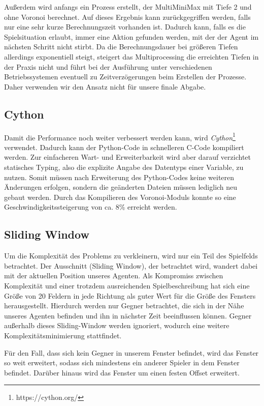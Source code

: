 Außerdem wird anfangs ein Prozess erstellt, der MultiMiniMax mit Tiefe 2 und ohne Voronoi berechnet. Auf dieses Ergebnis kann zurückgegriffen werden, falls nur eine sehr kurze Berechnungszeit vorhanden ist. Dadurch kann, falls es die Spielsituation erlaubt, immer eine Aktion gefunden werden, mit der der Agent im nächsten Schritt nicht stirbt. Da die Berechnungsdauer bei größeren Tiefen allerdings exponentiell steigt, steigert das Multiprocessing die erreichten Tiefen in der Praxis nicht und führt bei der Ausführung unter verschiedenen Betriebssystemen eventuell zu Zeitverzögerungen beim Erstellen der Prozesse. Daher verwenden wir den Ansatz nicht für unsere finale Abgabe.

\subsection{Cython}
Damit die Performance noch weiter verbessert werden kann, wird \textit{Cython}\footnote{https://cython.org/} verwendet. Dadurch kann der Python-Code in schnelleren C-Code kompiliert werden. Zur einfacheren Wart- und Erweiterbarkeit wird aber darauf verzichtet statisches Typing, also die explizite Angabe des Datentyps einer Variable, zu nutzen. Somit müssen nach Erweiterung des Python-Codes keine weiteren Änderungen erfolgen, sondern die geänderten Dateien müssen lediglich neu gebaut werden. Durch das Kompilieren des Voronoi-Moduls konnte so eine Geschwindigkeitssteigerung von ca. 8\% erreicht werden.

\subsection{Sliding Window}
Um die Komplexität des Problems zu verkleinern, wird nur ein Teil des Spielfelds betrachtet. Der Ausschnitt (Sliding Window), der betrachtet wird, wandert dabei mit der aktuellen Position unseres Agenten. Als Kompromiss zwischen Komplexität und einer trotzdem ausreichenden Spielbeschreibung hat sich eine Größe von 20 Feldern in jede Richtung als guter Wert für die Größe des Fensters herausgestellt. Hierdurch werden nur Gegner betrachtet, die sich in der Nähe unseres Agenten befinden und ihn in nächster Zeit beeinflussen können. Gegner außerhalb dieses Sliding-Window werden ignoriert, wodurch eine weitere Komplexitätsminimierung stattfindet.

Für den Fall, dass sich kein Gegner in unserem Fenster befindet, wird das Fenster so weit erweitert, sodass sich mindestens ein anderer Spieler in dem Fenster befindet. Darüber hinaus wird das Fenster um einen festen Offset erweitert.


